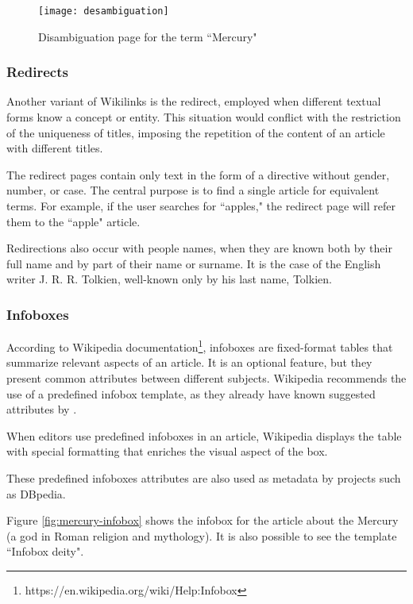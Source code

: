 \begin{figure}[!h]
\centering
  \texttt{[image: desambiguation]}
  \caption{Disambiguation page for the term ``Mercury"}
  \label{fig:mercury-desambiguation}
\end{figure}


\subsubsection{\hspace*{3pt} Redirects}

Another variant of Wikilinks is the redirect, employed when different textual forms know a concept or entity. This situation would conflict with the restriction of the uniqueness of titles, imposing the repetition of the content of an article with different titles. 

The redirect pages contain only text in the form of a directive without gender, number, or case. The central purpose is to find a single article for equivalent terms. For example, if the user searches for ``apples," the redirect page will refer them to the ``apple" article. 

Redirections also occur with people names, when they are known both by their full name and by part of their name or surname. It is the case of the English writer  J. R. R. Tolkien, well-known only by his last name, Tolkien.

\subsubsection{\hspace*{3pt} Infoboxes}

According to Wikipedia documentation\footnote{https://en.wikipedia.org/wiki/Help:Infobox}, infoboxes are fixed-format tables that summarize relevant aspects of an article. It is an optional feature, but they present common attributes between different subjects. Wikipedia recommends the use of a predefined infobox template, as they already have known suggested attributes by 
. 

When editors use predefined infoboxes in an article, Wikipedia displays the table with special formatting that enriches the visual aspect of the box. 

These predefined infoboxes attributes are also used as metadata by projects such as DBpedia. 

Figure \ref{fig:mercury-infobox} shows the infobox for the article about the Mercury (a god in Roman religion and mythology). It is also possible to see the template ``Infobox deity". 



